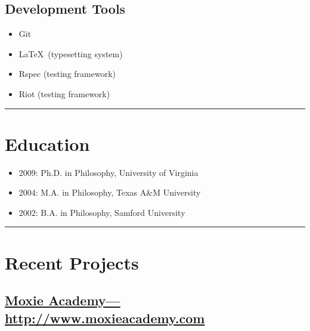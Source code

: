 \documentclass{article}
\begin{document}
\begin{multicols}{3}
\subsection{Development Tools} %
\label{sub:Development Tools}

\begin{itemize}
  \item Git
  \item \LaTeX\ (typesetting system)
  \item Rspec (testing framework)
  \item Riot (testing framework)
\end{itemize}

\end{multicols}

\hrule
\section{Education} %
\label{sec:Education}

\begin{itemize}
  \item 2009: Ph.D. in Philosophy, University of Virginia
  \item 2004: M.A. in Philosophy, Texas A\&M University
  \item 2002: B.A. in Philosophy, Samford University
\end{itemize}
\newpage
\hrule
\section{Recent Projects} %
\label{sec:Recent Projects}


\subsection{\href{http://www.moxieacademy.com}
  {Moxie Academy---http://www.moxieacademy.com}}
\label{sub:Moxie Academy}
\end{document}
